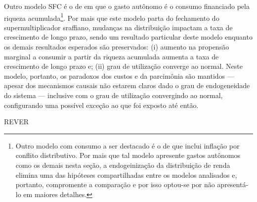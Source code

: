 Outro modelo SFC é o de \textcite{brochier_supermultiplier_2018} em que o gasto autônomo é o consumo financiado pela riqueza acumulada\footnote{
	Outro modelo com consumo a ser destacado é o de \textcite{nah_role_2019} %
	que inclui inflação por conflito distributivo. Por mais que tal modelo apresente gastos autônomos como os demais nesta seção, a endogeinização da distribuição de renda elimina uma das hipóteses compartilhadas entre os modelos analisados e, portanto, compromente a comparação e por isso optou-se por não apresentá-lo em maiores detalhes.
}. 
Por mais que este modelo parta do fechamento do supermultiplicador sraffiano,
mudanças na distribuição impactam a taxa de crescimento de longo prazo, sendo um resultado particular deste modelo enquanto os demais resultados esperados são preservados: (i) aumento na propensão marginal a consumir a partir da riqueza acumulada aumenta a taxa de crescimento de longo prazo e; 
	(ii) grau de utilização converge ao normal.
Neste modelo, portanto, os paradoxos dos custos e da parcimônia são mantidos --- apesar dos mecanismos causais não estarem claros dado o grau de endogeneidade do sistema --- inclusive com o grau de utilização convergindo ao normal, configurando uma possível exceção ao que foi exposto até então.

REVER




